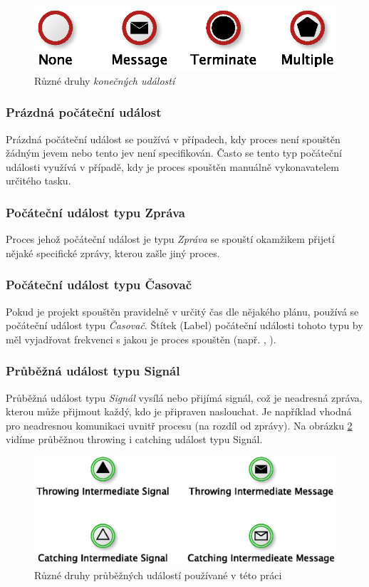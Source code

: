 \begin{figure}[H]\centering
\includegraphics{obrazky/end-events}
\caption{Různé druhy \textit{konečných událostí}}
\label{fig:konecne_udalosti}
\end{figure}

\subsubsection{Prázdná počáteční událost}
Prázdná počáteční událost se používá v případech, kdy proces není spouštěn žádným jevem nebo tento jev není specifikován. Často se tento typ počáteční události využívá v případě, kdy je proces spouštěn manuálně vykonavatelem určitého tasku.

\subsubsection{Počáteční událost typu Zpráva}
Proces jehož počáteční událost je typu \textit{Zpráva} se spouští okamžikem přijetí nějaké specifické zprávy, kterou zašle jiný proces.

\subsubsection{Počáteční událost typu Časovač}
Pokud je projekt spouštěn pravidelně v určitý čas dle nějakého plánu, používá se počáteční událost typu \textit{Časovač}. Štítek (Label) počáteční události tohoto typu by měl vyjadřovat frekvenci s jakou je proces spouštěn (např. , ).

\subsubsection{Průběžná událost typu Signál}
Průběžná událost typu \textit{Signál} vysílá nebo přijímá signál, což je neadresná zpráva, kterou může přijmout každý, kdo je připraven naslouchat. Je například vhodná pro neadresnou komunikaci uvnitř procesu (na rozdíl od zprávy). Na obrázku \ref{fig:prubezne_udalosti} vidíme průběžnou throwing i catching událost typu Signál. 

\begin{figure}[H]\centering
\includegraphics{obrazky/intermediate-events-signals-messages}
\caption{Různé druhy průběžných  událostí používané v této práci}
\label{fig:prubezne_udalosti}
\end{figure}


